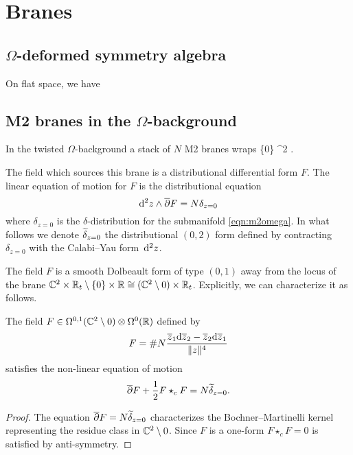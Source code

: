\documentclass[11pt]{amsart}
\begin{document}
\appendix 

\section{Branes}

\subsection{$\Omega$-deformed symmetry algebra}

On flat space, we have 



\subsection{M2 branes in the $\Omega$-background} 

\parsec[]

In the twisted $\Omega$-background a stack of $N$ M2 branes wraps 
\beqn\label{eqn:m2omega}
\{0\} \times \RR \subset \CC^2 \times \RR .
\eeqn

The field which sources this brane is a distributional differential form $F$.
The linear equation of motion for $F$ is the distributional equation 
\[
{\rm d}^2 z \wedge \overline{\partial} F = N \delta_{z=0} 
\]
where $\delta_{z=0}$ is the $\delta$-distribution for the submanifold \eqref{eqn:m2omega}.  
In what follows we denote $\widetilde{\delta}_{z=0}$ the distributional $(0,2)$ form defined by contracting $\delta_{z=0}$ with the Calabi--Yau form~${\rm d}^2 z$. 

The field $F$ is a smooth Dolbeault form of type $(0,1)$ away from the locus of the brane $\mathbb C^2 \times \mathbb R_t \setminus \{0\} \times \mathbb R \cong (\mathbb C^2 \setminus 0) \times \mathbb R_t$. 
Explicitly, we can characterize it as follows. 

\begin{prop}
The field $F \in \Omega^{0,1} (\mathbb C^2 \setminus 0) \otimes \Omega^{0} (\mathbb R) $ defined by 
\[
F = \# N \frac{\overline{z}_1 {\rm d} \overline{z}_2 - \overline{z}_2 {\rm d} \overline{z}_1}{\|z\|^4} 
\] 
satisfies the non-linear equation of motion 
\[
\overline{\partial} F + \frac12 F \star_c F = N  \widetilde{\delta}_{z=0} .
\]
\end{prop}
\begin{proof}
The equation $\overline{\partial} F = N  \widetilde{\delta}_{z=0}$ characterizes the Bochner--Martinelli kernel representing the residue class in $\mathbb C^2 \setminus 0$. 
Since $F$ is a one-form $F \star_c F = 0$ is satisfied by anti-symmetry. 
\end{proof}
\end{document}
